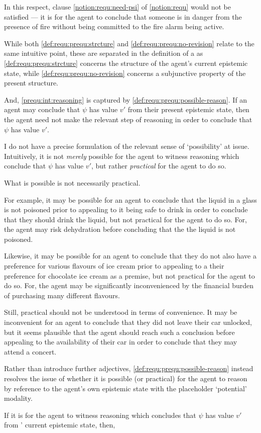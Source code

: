 \begin{note}
  In this respect, clause \ref{notion:requ:need-psi} of \autoref{notion:requ} would not be satisfied --- it is \epVAd{} for the agent to conclude that someone is in danger from the presence of fire without being committed to the fire alarm being active.

  While both \ref{def:requ:prequ:strcture} and \ref{def:requ:prequ:no-revision} relate to the same intuitive point, these are separated in the definition of a \prequ{} as \ref{def:requ:prequ:strcture} concerns the structure of the agent's current epistemic state, while \ref{def:requ:prequ:no-revision} concerns a subjunctive property of the present structure.
\end{note}

\begin{note}
  And, \ref{prequ:int:reasoning} is captured by \ref{def:requ:prequ:possible-reason}.
  If an agent may conclude that \(\psi\) has value \(v'\) from their present epistemic state, then the agent need not make the relevant step of reasoning in order to conclude that \(\psi\) has value \(v'\).

  I do not have a precise formulation of the relevant sense of `possibility' at issue.
  Intuitively, it is not \emph{merely} possible for the agent to witness reasoning which conclude that \(\psi\) has value \(v'\), but rather \emph{practical} for the agent to do so.

  What is possible is not necessarily practical.

  For example, it may be possible for an agent to conclude that the liquid in a glass is not poisoned prior to appealing to it being safe to drink in order to conclude that they should drink the liquid, but not practical for the agent to do so.
  For, the agent may risk dehydration before concluding that the the liquid is not poisoned.

  Likewise, it may be possible for an agent to conclude that they do not also have a preference for various flavours of ice cream prior to appealing to a their preference for chocolate ice cream as a premise, but not practical for the agent to do so.
  For, the agent may be significantly inconvenienced by the financial burden of purchasing many different flavours.

  Still, practical should not be understood in terms of convenience.
  It may be inconvenient for an agent to conclude that they did not leave their car unlocked, but it seems plausible that the agent should reach such a conclusion before appealing to the availability of their car in order to conclude that they may attend a concert.

  Rather than introduce further adjectives, \ref{def:requ:prequ:possible-reason} instead resolves the issue of whether it is possible (or practical) for the agent to reason by reference to the agent's own epistemic state with the placeholder `potential' modality.

  If it is \epVAd{} for the agent to witness reasoning which concludes that \(\psi\) has value \(v'\) from \vAgent{}' current epistemic state, then, 
\end{note}

